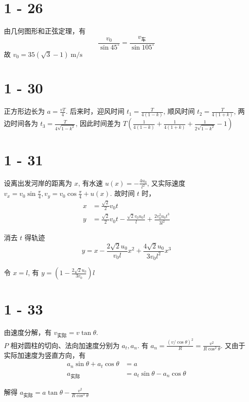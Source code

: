 \documentclass{article}
\newcommand{\mps}{\ \mathrm{m / s}}
\begin{document}
\section*{1 - 26}

由几何图形和正弦定理，有 
\[
    \frac{v_0}{\sin 45^\circ } = \frac{v_{车}}{\sin 105^\circ}
\]
故 $v_0 = 35\left(\sqrt{3} - 1\right) \mps$

\section*{1 - 30}

正方形边长为 $a = \frac{vT}{4}$. 后来时，迎风时间 $t_1 = \frac{T}{4(1 - k)}$, 顺风时间 $t_2 = \frac{T}{4(1 + k)}$, 两边时间各为 $t_3 = \frac{T}{4\sqrt{1 - k^2}}$, 因此时间差为 $T\left(\frac{1}{4(1 - k)} + \frac{1}{4(1 + k)} + \frac{1}{2\sqrt{1 - k^2}} - 1\right)$

\section*{1 - 31}

设离出发河岸的距离为 $x$, 有水速 $u(x) = -\frac{4u_0}{l^2}$, 又实际速度 $v_x = v_0 \sin \frac{\pi}{4}, v_y = v_0 \cos \frac{\pi}{4} + u(x)$. 故时间 $t$ 时，
\begin{align*}
    x &= \frac{\sqrt{2}}{2}v_0 t \\
    y &= \frac{\sqrt{2}}{2}v_0 t - \frac{\sqrt{2}v_0u_0t}{l} + \frac{2v_0^2u_0t^3}{3l^2}
\end{align*}

消去 $t$ 得轨迹 
\[
    y = x - \frac{2\sqrt{2}u_0}{v_0l}x^2 + \frac{4\sqrt{2}u_0}{3v_0l^2}x^3
\]

令 $x = l$, 有 $y = \left(1 - \frac{2\sqrt{2}u_0}{3v_0}\right)l$

\section*{1 - 33}

由速度分解，有 $v_{\text{实际}} = v \tan \theta$. \\
$P$ 相对圆柱的切向、法向加速度分别为 $a_t, a_n$. 有 $a_n = \frac{\left(v / \cos \theta\right)^2}{R} = \frac{v^2}{R \cos^2 \theta}$. 又由于实际加速度为竖直方向，有
\begin{align*}
    a_n \sin \theta + a_t \cos \theta &= a \\
    a_{\text{实际}} &= a_t \sin \theta - a_n \cos \theta
\end{align*}

解得 $a_{\text{实际}} = a \tan \theta - \frac{v^2}{R\cos^3 \theta}$
\end{document}
